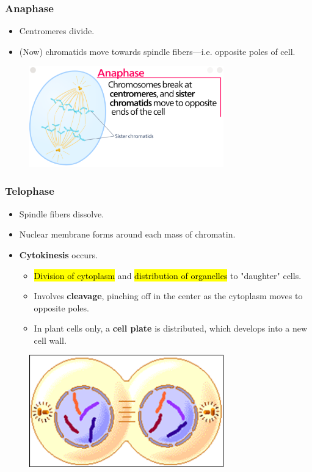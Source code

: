 \documentclass[a4paper,12pt]{article}
\begin{document}
\pagebreak

\subsubsection{Anaphase}
\begin{itemize}
    \item{Centromeres divide.}
    \item{(Now) chromatids move towards spindle fibers---i.e. opposite poles of cell.}
\end{itemize}

\begin{figure}[H]
    \centering
    \includegraphics[width=0.75\textwidth]{anaphase}
\end{figure}

\subsubsection{Telophase}
\begin{itemize}
    \item{Spindle fibers dissolve.}
    \item{Nuclear membrane forms around each mass of chromatin.}
    \item{
            \textbf{Cytokinesis} occurs.

            \begin{itemize}
                \item{\hl{Division of cytoplasm} and \hl{distribution of organelles} to "daughter" cells.}
                \item{Involves \textbf{cleavage}, pinching off in the center as the cytoplasm moves to opposite poles.}
                \item{In plant cells only, a \textbf{cell plate} is distributed, which develops into a new cell wall.}
            \end{itemize}
        }
\end{itemize}

\begin{figure}[H]
    \centering
    \includegraphics[width=0.75\textwidth]{telophase}
\end{figure}
\end{document}
